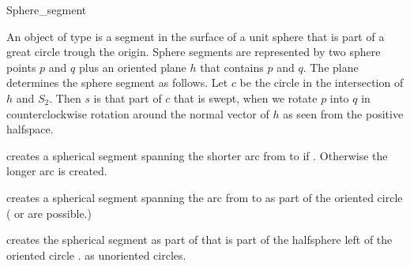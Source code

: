 
\begin{ccRefClass}{Sphere_segment}

\ccDefinition

An object  of type  is a segment in the
surface of a unit sphere that is part of a great circle trough the
origin. Sphere segments are represented by two sphere points $p$ and
$q$ plus an oriented plane $h$ that contains $p$ and $q$. The plane
determines the sphere segment as follows. Let $c$ be the circle in the
intersection of $h$ and $S_2$. Then $s$ is that part of $c$ that is
swept, when we rotate $p$ into $q$ in counterclockwise rotation around
the normal vector of $h$ as seen from the positive halfspace.

\ccSetOneOfTwoColumns{4cm}

\ccCreation


{ creates a spherical segment spanning
  the shorter arc from  to  if . Otherwise the longer arc is created.   }

{ creates a spherical segment spanning the
  arc from  to  as part of the oriented circle 
  ( or  are possible.)
    }

{ creates the spherical segment as part of  that is part
  of the halfsphere left of the oriented circle .  \ccPrecond
   as unoriented circles.  }

\ccSetTwoOfThreeColumns{3.5cm}{2.5cm}

\ccOperations





\end{ccRefClass}
